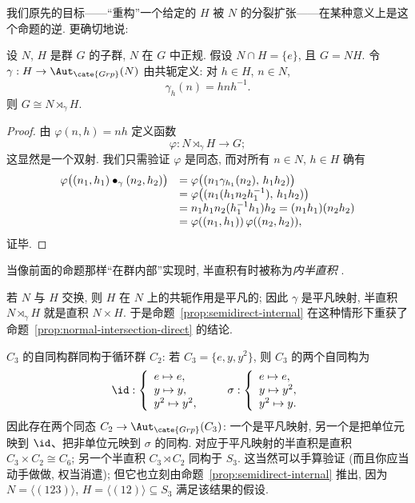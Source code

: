 我们原先的目标——``重构''一个给定的 $H$ 被 $N$ 的分裂扩张——在某种意义上是这个命题的逆. 更确切地说:

\begin{proposition}
\label{prop:semidirect-internal}
设 $N$, $H$ 是群 $G$ 的子群, $N$ 在 $G$ 中正规. 假设 $N \cap H = \{e\}$, 且 $G = NH$. 令 $\gamma : H \to \Aut_{\cate{Grp}}(N)$ 由共轭定义: 对 $h \in H$, $n \in N$,
\[
\gamma_h(n) = h n h^{-1}.
\]
则 $G \cong N \rtimes_{\gamma} H$.
\end{proposition}

\begin{proof}
由 $\varphi(n, h) = nh$ 定义函数
\[
\varphi : N \rtimes_{\gamma} H \to G;
\]
这显然是一个双射. 我们只需验证 $\varphi$ 是同态, 而对所有 $n \in N$, $h \in H$ 确有
\[
\begin{array}{r l}
\varphi\bigl((n_1, h_1) \bullet_{\gamma} (n_2, h_2)\bigr)
& = \varphi\bigl((n_1 \gamma_{h_1}(n_2),\, h_1 h_2)\bigr) \\
& = \varphi\bigl((n_1 (h_1 n_2 h_1^{-1}),\, h_1 h_2)\bigr) \\
& = n_1 h_1 n_2 (h_1^{-1} h_1) h_2 = (n_1 h_1)(n_2 h_2) \\
& = \varphi((n_1, h_1))\,\varphi((n_2, h_2)),
\end{array}
\]
证毕.
\end{proof}

当像前面的命题那样``在群内部''实现时, 半直积有时被称为\emph{内半直积}%
%
.

\begin{remark}
\label{rem:semidirect-abelian}
若 $N$ 与 $H$ 交换, 则 $H$ 在 $N$ 上的共轭作用是平凡的; 因此 $\gamma$ 是平凡映射, 半直积 $N \rtimes_{\gamma} H$ 就是直积 $N \times H$. 于是命题~\ref{prop:semidirect-internal} 在这种情形下重获了命题~\ref{prop:normal-intersection-direct} 的结论.
\end{remark}

\begin{example}
\label{ex:semidirect-c3}
$C_3$ 的自同构群同构于循环群 $C_2$: 若 $C_3 = \{e, y, y^2\}$, 则 $C_3$ 的两个自同构为
\[
\id : \left\{
\begin{array}{l}
e \mapsto e, \\
y \mapsto y, \\
y^2 \mapsto y^2,
\end{array}
\right.
\qquad
\sigma : \left\{
\begin{array}{l}
e \mapsto e, \\
y \mapsto y^2, \\
y^2 \mapsto y.
\end{array}
\right.
\]
因此存在两个同态 $C_2 \to \Aut_{\cate{Grp}}(C_3)$: 一个是平凡映射, 另一个是把单位元映到 $\id$、把非单位元映到 $\sigma$ 的同构. 对应于平凡映射的半直积是直积 $C_3 \times C_2 \cong C_6$; 另一个半直积 $C_3 \rtimes C_2$ 同构于 $S_3$. 这当然可以手算验证 (而且你应当动手做做, 权当消遣); 但它也立刻由命题~\ref{prop:semidirect-internal} 推出, 因为 $N = \langle(123)\rangle$, $H = \langle(12)\rangle \subseteq S_3$ 满足该结果的假设.
\end{example}


